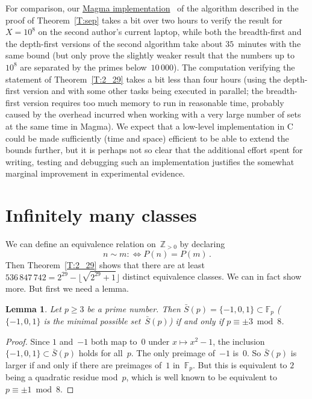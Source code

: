 \documentclass[12pt,a4paper]{amsart}
\newcommand{\Z}{{\mathbb Z}}
\newcommand{\F}{{\mathbb F}}
\newtheorem{Lemma}[Theorem]{Lemma}
\theoremstyle{definition}
\numberwithin{equation}{section}
\begin{document}
For comparison, our
\href{https://www.mathe2.uni-bayreuth.de/stoll/magma/Penkov_question.magma}{Magma implementation}~\cite{Code}
of the algorithm described in the proof of Theorem~\ref{T:sep} takes a bit over two hours
to verify the result for $X = 10^8$ on the second author's current laptop,
while both the breadth-first and the depth-first versions of the second algorithm
take about $35$~minutes with the same bound
(but only prove the slightly weaker result that the numbers up to~$10^8$ are
separated by the primes below~$10\,000$). The computation verifying the statement
of Theorem~\ref{T:2_29} takes a bit less than four hours (using the depth-first version
and with some other tasks being executed in parallel; the breadth-first
version requires too much memory to run in reasonable time, probably caused by
the overhead incurred when working with a very large number of sets at the same time in Magma).
We expect that a low-level implementation in C could be made sufficiently (time and space)
efficient to be able to extend the bounds further, but it is perhaps not so clear
that the additional effort spent for writing, testing and debugging such an implementation
justifies the somewhat marginal improvement in experimental evidence.


\section{Infinitely many classes} \label{S:infinite}

We can define an equivalence relation on~$\Z_{>0}$ by declaring
\[ n \sim m :\iff P(n) = P(m) \,. \]
Then Theorem~\ref{T:2_29} shows that there are at least
$536\,847\,742 = 2^{29} - \lfloor\sqrt{2^{29} + 1}\rfloor$
distinct equivalence classes. We can in fact show more. But first we need a lemma.

\begin{Lemma} \label{L:Smin}
  Let $p \geqslant 3$ be a prime number. Then $\bar{S}(p) = \{-1,0,1\} \subset \F_p$
  ($\{-1,0,1\}$ is the minimal possible set~$\bar{S}(p)$) if and only if $p \equiv \pm 3 \bmod 8$.
\end{Lemma}

\begin{proof}
  Since $1$ and~$-1$ both map to~$0$ under $x \mapsto x^2 - 1$, the inclusion
  $\{-1,0,1\} \subset \bar{S}(p)$ holds for all~$p$.
  The only preimage of~$-1$ is~$0$. So $\bar{S}(p)$ is larger if and only if
  there are preimages of~$1$ in~$\F_p$. But this is equivalent to $2$ being a quadratic
  residue mod~$p$, which is well known to be equivalent to $p \equiv \pm 1 \bmod 8$.
\end{proof}
\end{document}
